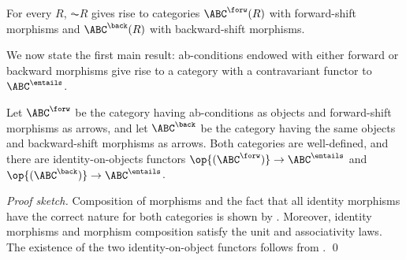 %
\iffull
\begin{proposition}
For every $R$, $\AC R$ gives rise to categories $\ABC^\forw(R)$ with forward-shift morphisms and $\ABC^\back(R)$ with backward-shift morphisms.
\end{proposition}
%
\fi
We now state the first main result: ab-conditions endowed with either forward or backward morphisms give rise to a category with a contravariant functor to $\ABC^{\entails}$.

\begin{theorem}
Let $\ABC^{\forw}$ be the category having ab-conditions as objects and forward-shift morphisms as arrows, and let $\ABC^{\back}$ be the category having the same objects and backward-shift morphisms as arrows. Both categories are well-defined, and there are identity-on-objects functors $\op{(\ABC^{\forw})} \to \ABC^{\entails}$ and $\op{(\ABC^{\back})} \to \ABC^{\entails}$.
\end{theorem}
%
\emph{Proof sketch.} Composition of morphisms and the fact that all identity morphisms have the correct nature for both categories is shown by .
Moreover, identity morphisms and morphism composition satisfy the unit and associativity laws. The existence of the two identity-on-object functors follows from .
\qed 

